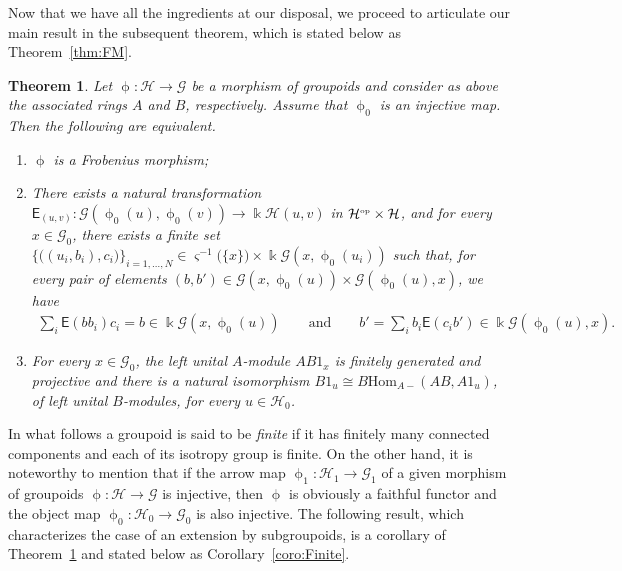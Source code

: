 \documentclass[10pt,a4paper]{amsart}
\numberwithin{equation}{section}
\newtheorem{Theorem}{Theorem}[section]
\newcommand{\Sf}[1]{\mathsf{#1}}
\renewcommand{\hom}[3]{\mathrm{Hom}_{\Sscript{#1}}\left(#2, #3\right)}
\newcommand{\Go}{\cG_{\Sscript{0}}}
\newcommand{\Ga}{\cG_{\Sscript{1}}}
\newcommand{\Ho}{\cH_{\Sscript{0}}}
\newcommand{\Ha}{\cH_{\Sscript{1}}}
\newcommand{\cG}{{\mathcal G}}
\newcommand{\cH}{{\mathcal H}}
\newcommand{\Sscript}[1]{\scriptscriptstyle{#1}}
\newcommand{\phio}{\upphi_{\Sscript{0}}}
\newcommand{\phia}{\upphi_{\Sscript{1}}}
\begin{document}
Now that we have all the ingredients at our disposal, we proceed to articulate our main result in the subsequent theorem, which is stated below as Theorem~\ref{thm:FM}.

\begin{Theorem}\label{thmA:FM}Let $\upphi\colon \cH \to \cG$ be a morphism of groupoids and consider as above the associated rings $A$ and $B$, respectively. Assume that $\upphi_{\Sscript{0}}$ is an injective map. Then the following are equivalent.
\begin{enumerate}[$(i)$]\itemsep=0pt
\item $\upphi$ is a Frobenius morphism;
\item There exists a natural transformation $\Sf{E}_{\Sscript{(u, v)}}\colon \cG(\phio(u),\phio(v)) \longrightarrow \Bbbk \cH(u,v)$ in $\cH^{\Sscript{\rm op}} \times \cH$, and for every $x \in \Go$, there exists a finite set $\{\big((u_{i},b_{i}), c_{i}\big)\}_{i=1, \dots, N} \in \varsigma^{-1}\big( \{x\}\big)\times \Bbbk \cG(x, \phio(u_{i}))$ such that, for every pair of elements $ (b, b') \in \cG(x, \phio(u)) \times \cG(\phio(u), x)$, we have
\begin{gather*}
\sum_{i}\Sf{E}(bb_{i})c_{i} = b \in \Bbbk \cG(x, \phio(u)) \qquad \text{and} \qquad b' = \sum_{i}b_{i}\Sf{E}(c_{i}b') \in \Bbbk \cG(\phio(u), x).
\end{gather*}
\item For every $x\in \Go$, the left unital $A$-module $AB1_{x}$ is finitely generated and projective and there is a natural isomorphism $B1_{u} \cong B\hom{A-}{AB}{A1_{u}}$, of left
unital $B$-modules, for every $u\in \Ho$.
\end{enumerate}
\end{Theorem}

In what follows a groupoid is said to be \emph{finite} if it has finitely many connected components and each of its isotropy group is finite. On the other hand, it is noteworthy to mention that if the arrow map $\phia\colon \Ha \to \Ga$ of a given morphism of groupoids $\upphi\colon \cH \to \cG$ is injective, then $\upphi$ is obviously a faithful functor and the object map $\phio\colon \Ho \to \Go$ is also injective. The following result, which characterizes the case of an extension by subgroupoids, is a corollary of Theorem~\ref{thmA:FM} and stated below as Corollary~\ref{coro:Finite}.
\end{document}
